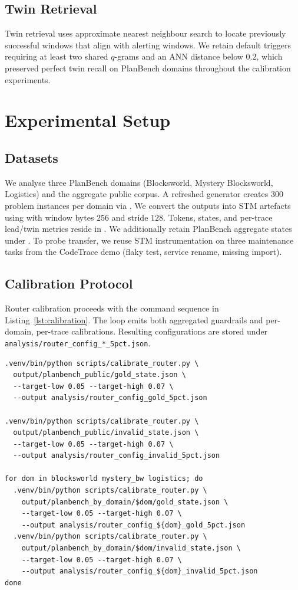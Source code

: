 \documentclass[11pt]{article}
\begin{document}
\subsection{Twin Retrieval}
Twin retrieval uses approximate nearest neighbour search to locate previously
successful windows that align with alerting windows. We retain default triggers
requiring at least two shared $q$-grams and an ANN distance below $0.2$, which
preserved perfect twin recall on PlanBench domains throughout the calibration
experiments.

\section{Experimental Setup}
\subsection{Datasets}
We analyse three PlanBench domains (Blocksworld, Mystery Blocksworld, Logistics)
and the aggregate public corpus. A refreshed generator creates 300 problem
instances per domain via . We
convert the outputs into STM artefacts using 
with window bytes $256$ and stride $128$. Tokens, states, and per-trace
lead/twin metrics reside in . We
additionally retain PlanBench aggregate states under .
To probe transfer, we reuse STM
instrumentation on three maintenance tasks from the CodeTrace demo (flaky test,
service rename, missing import).

\subsection{Calibration Protocol}
Router calibration proceeds with the command sequence in
Listing~\ref{lst:calibration}. The loop emits both aggregated guardrails and
per-domain, per-trace calibrations. Resulting configurations are stored under
\texttt{analysis/router\_config\_*\_5pct.json}.

\begin{lstlisting}[style=stm, caption={Router calibration commands.}, label={lst:calibration}]
.venv/bin/python scripts/calibrate_router.py \
  output/planbench_public/gold_state.json \
  --target-low 0.05 --target-high 0.07 \
  --output analysis/router_config_gold_5pct.json

.venv/bin/python scripts/calibrate_router.py \
  output/planbench_public/invalid_state.json \
  --target-low 0.05 --target-high 0.07 \
  --output analysis/router_config_invalid_5pct.json

for dom in blocksworld mystery_bw logistics; do
  .venv/bin/python scripts/calibrate_router.py \
    output/planbench_by_domain/$dom/gold_state.json \
    --target-low 0.05 --target-high 0.07 \
    --output analysis/router_config_${dom}_gold_5pct.json
  .venv/bin/python scripts/calibrate_router.py \
    output/planbench_by_domain/$dom/invalid_state.json \
    --target-low 0.05 --target-high 0.07 \
    --output analysis/router_config_${dom}_invalid_5pct.json
done
\end{lstlisting}
\end{document}
